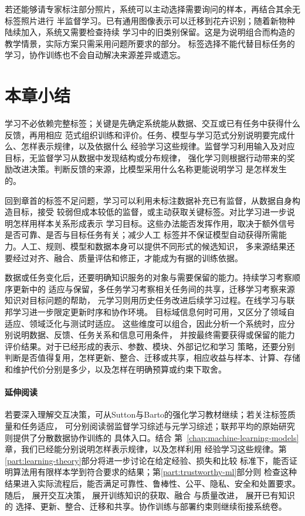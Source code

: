 若还能够请专家标注部分照片，系统可以主动选择需要询问的样本，再结合其余无标签照片进行
半监督学习。已有通用图像表示可以迁移到花卉识别；随着新物种陆续加入，系统又需要检查持续
学习中的旧类别保留。这是为说明组合而构造的教学情景，实际方案只需采用问题所要求的部分。
标签选择不能代替目标任务的学习，协作训练也不会自动解决来源差异或遗忘。

\section{本章小结}
\label{sec:machine-learning-paradigms-summary}

学习不必依赖完整标签；关键是先确定系统能从数据、交互或已有任务中获得什么反馈，再用相应
范式组织训练和评价。任务、模型与学习范式分别说明要完成什么、怎样表示规律，以及依据什么
经验学习这些规律。监督学习利用输入及对应目标，无监督学习从数据中发现结构或分布规律，
强化学习则根据行动带来的奖励改进决策。判断反馈的来源，比模型采用什么名称更能说明学习
是怎样发生的。

回到章首的标签不足问题，学习可以利用未标注数据补充已有监督，从数据自身构造目标，接受
较弱但成本较低的监督，或主动获取关键标签。对比学习进一步说明怎样用样本关系形成表示
学习目标。这些办法能否发挥作用，取决于额外信号是否可靠、是否与目标任务有关；减少人工
标签并不保证模型自动获得所需能力。人工、规则、模型和数据本身可以提供不同形式的候选知识，
多来源结果还要经过对齐、融合、质量评估和修正，才能成为有据的训练依据。

数据或任务变化后，还要明确知识服务的对象与需要保留的能力。持续学习考察顺序更新中的
适应与保留，多任务学习考察相关任务间的共享，迁移学习考察来源知识对目标问题的帮助，
元学习则用历史任务改进后续学习过程。在线学习与联邦学习进一步限定更新时序和协作环境。
目标域信息何时可用，又区分了领域自适应、领域泛化与测试时适应。
这些维度可以组合，因此分析一个系统时，应分别说明数据、反馈、任务关系和信息可用条件，
并按最终需要获得或保留的能力评价结果。对于已经形成的表示、参数、模块、外部记忆和学习
策略，还要分别判断是否值得复用，怎样更新、整合、迁移或共享，相应收益与样本、计算、存储
和维护代价分别是多少，以及怎样在明确预算或约束下取舍。

\paragraph{延伸阅读}

若要深入理解交互决策，可从Sutton与Barto的强化学习教材继续；若关注标签质量和任务适应，
可分别阅读弱监督学习综述与元学习综述；联邦平均的原始研究则提供了分散数据协作训练的
具体入口。结合
第~\ref{chap:machine-learning-models}章，我们已经能分别说明怎样表示规律，以及怎样利用
经验学习这些规律。第\ref{part:learning-theory}部分将进一步讨论在给定经验、损失和比较
标准下，能否证明算法用有限样本学到符合要求的结果；第\ref{part:trustworthy-ml}部分则
检查这种结果进入实际流程后，能否满足可靠性、鲁棒性、公平、隐私、安全和处置要求。随后，
展开交互决策，
展开训练知识的获取、融合
与质量改进，
展开已有知识的
选择、更新、整合、迁移和共享。协作训练与部署约束则继续衔接系统卷。

